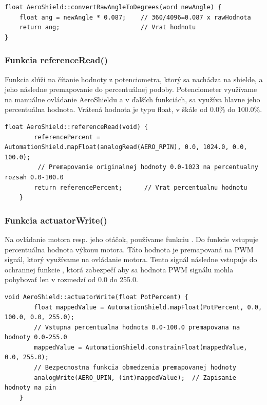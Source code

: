 \begin{lstlisting}[caption={Zdrojový kód funkcie convertRawAngleToDegrees.},captionpos=b]
float AeroShield::convertRawAngleToDegrees(word newAngle) {  
	float ang = newAngle * 0.087;    // 360/4096=0.087 x rawHodnota                             
	return ang;                      // Vrat hodnotu
}
\end{lstlisting}


\subsubsection{Funkcia referenceRead()}

Funkcia  slúži na čítanie hodnoty z potenciometra, ktorý sa nachádza na shielde, a jeho následne premapovanie do percentuálnej podoby. Potenciometer využívame na manuálne ovládanie AeroShieldu a v ďalších funkciách, sa využíva hlavne jeho percentuálna hodnota. Vrátená hodnota je typu float, v škále od 0.0\% do 100.0\%. 

\begin{lstlisting}[caption={Zdrojový kód funkcie referenceRead.},captionpos=b]
	  float AeroShield::referenceRead(void) {      
		referencePercent = AutomationShield.mapFloat(analogRead(AERO_RPIN), 0.0, 1024.0, 0.0, 100.0);  
		 // Premapovanie originalnej hodnoty 0.0-1023 na percentualny rozsah 0.0-100.0
		return referencePercent;      // Vrat percentualnu hodnotu 
	}
\end{lstlisting}
	
\subsubsection{Funkcia actuatorWrite()}	
	
Na ovládanie motora resp. jeho otáčok, používame funkciu . Do funkcie vstupuje percentuálna hodnota výkonu motora. Táto hodnota je premapovaná na PWM signál, ktorý využívame na ovládanie motora. Tento signál následne vstupuje do ochrannej funkcie , ktorá zabezpečí aby sa hodnota PWM signálu mohla pohybovať len v rozmedzí od 0.0 do 255.0. 
	
	
\begin{lstlisting}[caption={Zdrojový kód funkcie actuatorWrite.},captionpos=b]
	void AeroShield::actuatorWrite(float PotPercent) {   
		float mappedValue = AutomationShield.mapFloat(PotPercent, 0.0, 100.0, 0.0, 255.0);       
		// Vstupna percentualna hodnota 0.0-100.0 premapovana na hodnoty 0.0-255.0
		mappedValue = AutomationShield.constrainFloat(mappedValue, 0.0, 255.0);  
		// Bezpecnostna funkcia obmedzenia premapovanej hodnoty
		analogWrite(AERO_UPIN, (int)mappedValue);  // Zapisanie hodnoty na pin
	}
\end{lstlisting}
	
